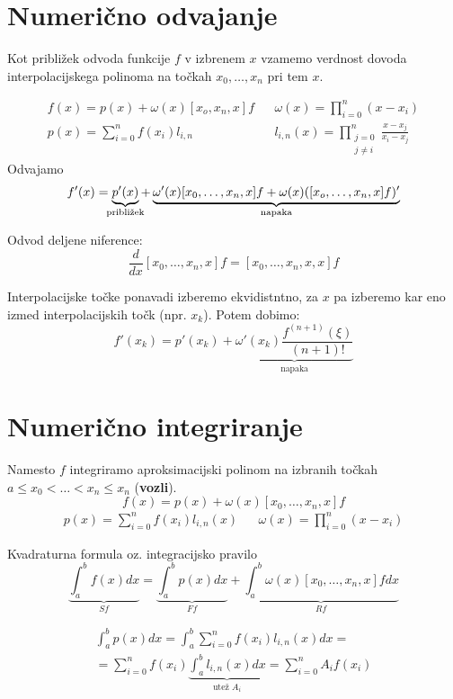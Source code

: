 \begin{multicols}{5}
\section*{Numerično odvajanje}
Kot približek odvoda funkcije $f$ v izbrenem $x$ vzamemo verdnost dovoda interpolacijskega
polinoma na točkah $x_0, \dots, x_n$ pri tem $x$.

\begin{align*}
    f(x) = p(x) + \omega(x)[x_o, x_n, x]f && \omega(x) = \prod_{i=0}^n (x-x_i) \\
    p(x) = \sum_{i=0}^n f(x_i) l_{i,n} && l_{i,n}(x) = \prod_{\substack{j=0 \\ j \neq i}}^n \frac{x-x_j}{x_i - x_j}
\end{align*}
Odvajamo 
\[
f'(x) = 
\underbrace{p'(x)}_{\mathclap{\text{približek}}} + 
\underbrace{\omega'(x)[x_0, \dots, x_n, x] f + \omega(x)([x_o, \dots, x_n, x] f)'}_{\text{napaka}}
\]

Odvod deljene niference:
\[ \frac{d}{dx} [x_0, \dots, x_n, x] f = [x_0, \dots, x_n, x, x] f\]

Interpolacijske točke ponavadi izberemo ekvidistntno, za $x$ pa izberemo kar eno izmed
interpolacijskih točk (npr. $x_k$). Potem dobimo:
\[ 
    f'(x_k) = p'(x_k) + 
    \underbrace{\omega'(x_k) \frac{f^{(n+1)}(\xi)}{(n+1)!}}_{\text{napaka}}
\]

\section*{Numerično integriranje}

Namesto $f$ integriramo aproksimacijski polinom na izbranih točkah $a \leq x_0 < \dots < x_n \leq x_n$ (\textbf{vozli}).
\[
f(x) = p(x) + \omega(x) [x_0, \dots, x_n, x] f
\]
\begin{align*}
    p(x) = \sum_{i=0}^n f(x_i) l_{i,n}(x) && \omega(x) = \prod_{i=0}^n (x-x_i)
\end{align*}

Kvadraturna formula oz. integracijsko pravilo
\[
\underbrace{\int_a^b f(x) dx}_{Sf} =
\underbrace{\int_a^b p(x) dx}_{Ff} +
\underbrace{\int_a^b \omega(x)[x_0, \dots, x_n, x]f dx}_{Rf} 
\]

\begin{multline*}  
    \int_a^b p(x) dx = 
    \int_a^b \sum_{i=0}^n f(x_i) l_{i,n}(x) dx = \\
    = \sum_{i=0}^n f(x_i) \underbrace{\int_a^b l_{i,n}(x) dx}_{\text{utež } A_i} = 
    \sum_{i=0}^n A_i f(x_i)
\end{multline*}


\end{multicols}
